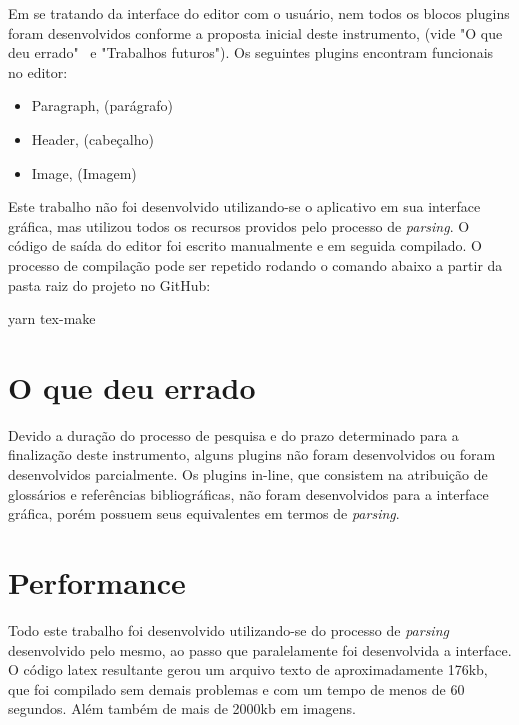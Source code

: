 Em se tratando da interface do editor com o usuário, nem todos os blocos plugins foram desenvolvidos
conforme a proposta inicial deste instrumento, (vide "O que deu errado"~ e "Trabalhos futuros").
Os seguintes plugins encontram funcionais no editor:

\begin{itemize}
        
	\item Paragraph, (parágrafo)
	\item Header, (cabeçalho)
	\item Image, (Imagem)
    
\end{itemize}

Este trabalho não foi desenvolvido utilizando-se o aplicativo em sua interface gráfica, mas utilizou todos os recursos providos pelo processo de \textit{parsing}. O código de saída do editor foi escrito manualmente e em seguida compilado. O processo de compilação pode ser repetido rodando o comando abaixo a partir da pasta raiz do projeto no GitHub:

\begin{Codee996256328524c238dd8b058b8d76964}
yarn tex-make
\end{Codee996256328524c238dd8b058b8d76964}

\section{O que deu errado}

Devido a duração do processo de pesquisa e do prazo determinado para a finalização deste instrumento,
alguns plugins não foram desenvolvidos ou foram desenvolvidos parcialmente. Os plugins in-line, que consistem
na atribuição de glossários e referências bibliográficas, não foram desenvolvidos para a interface gráfica,
porém possuem seus equivalentes em termos de \textit{parsing}.

\section{Performance}

Todo este trabalho foi desenvolvido utilizando-se do processo de \textit{parsing} desenvolvido pelo mesmo, ao passo que
paralelamente foi desenvolvida a interface.
O código
\acrshort{latex}
resultante gerou um arquivo texto de aproximadamente 176kb, que foi compilado sem demais problemas
e com um tempo de menos de 60 segundos. Além também de mais de 2000kb em imagens.

